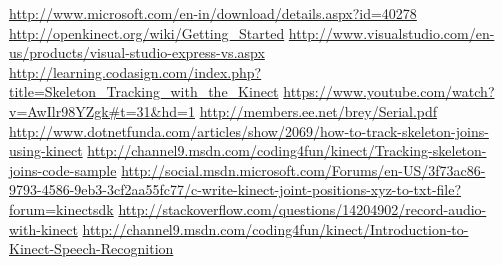\documentclass[20pt]{report}
\begin{document}
\begin{thebibliography}{99}
 \url{http://www.microsoft.com/en-in/download/details.aspx?id=40278}
 \url{http://openkinect.org/wiki/Getting\_Started}
 \url{http://www.visualstudio.com/en-us/products/visual-studio-express-vs.aspx}
 \url{http://learning.codasign.com/index.php?title=Skeleton\_Tracking\_with\_the\_Kinect}
 \url{https://www.youtube.com/watch?v=AwIlr98YZgk#t=31\&hd=1}
 \url{http://members.ee.net/brey/Serial.pdf}
 \url{http://www.dotnetfunda.com/articles/show/2069/how-to-track-skeleton-joins-using-kinect}
 \url{http://channel9.msdn.com/coding4fun/kinect/Tracking-skeleton-joins-code-sample}
 \url{http://social.msdn.microsoft.com/Forums/en-US/3f73ac86-9793-4586-9eb3-3cf2aa55fc77/c-write-kinect-joint-positions-xyz-to-txt-file?forum=kinectsdk}
 \url{http://stackoverflow.com/questions/14204902/record-audio-with-kinect}
 \url{http://channel9.msdn.com/coding4fun/kinect/Introduction-to-Kinect-Speech-Recognition}
\end{thebibliography}
\end{document}
